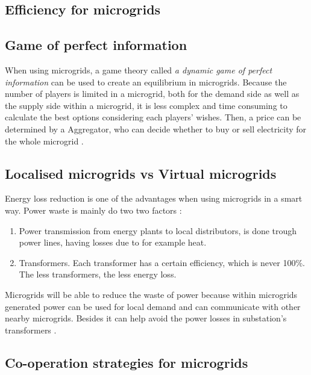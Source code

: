 \subsection{Efficiency for microgrids}

\subsection{Game of perfect information}
When using microgrids, a game theory called \emph{a dynamic game of perfect information}  can be used to create an equilibrium in microgrids. Because the number of players is limited in a microgrid, both for the demand side as well as the supply side within a microgrid, it is less complex and time consuming to calculate the best options considering each players' wishes. Then, a price can be determined by a Aggregator, who can decide whether to buy or sell electricity for the whole microgrid \cite{MicrogridModellingPetrosAristidou}.

\subsection{Localised microgrids vs Virtual microgrids}
Energy loss reduction is one of the advantages when using microgrids in a smart way. Power waste is mainly do two two factors \cite{EnergyLossURL}: 

\begin{enumerate}
\item Power transmission from energy plants to local distributors, is done trough power lines, having losses due to for example heat.
\item Transformers. Each transformer has a certain efficiency, which is never 100\%. The less transformers, the less energy loss.
\end{enumerate}

Microgrids will be able to reduce the waste of power because within microgrids generated power can be used for local demand and can communicate with other nearby microgrids. Besides it can help avoid the power losses in substation's transformers \cite{keypaper}.

\subsection{Co-operation strategies for microgrids}




